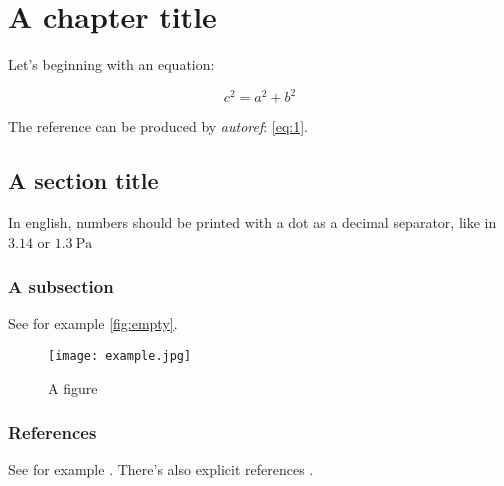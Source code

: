 \documentclass[a5,brazil,english]{brthesis}
\begin{document}
\renewcommand{\nomname}{\listadesimbolosname}
\pdfbookmark[0]{\nomname}{las}
\printnomenclature
\cleardoublepage

\tableofcontents*
\cleardoublepage

\textual

\chapter{A chapter title}
\label{cha:chapter-title}

Let's beginning with an equation:

\begin{equation}
  \label{eq:1}
  c^2 = a^2 + b^2
\end{equation}

The reference can be produced by \textsl{autoref}: \autoref{eq:1}.

\section{A section title}
\label{sec:section-title}

In english, numbers should be printed with a dot as a decimal separator, like in $\num{3.14}$ or $\SI{1.3}{\pascal}$

\subsection{A subsection}
\label{sec:subsection}

See for example \autoref{fig:empty}.

\begin{figure}[!ht]
  \centering
  \texttt{[image: example.jpg]}
  \caption{A figure}
  \label{fig:empty}
\end{figure}

\subsection{References}
\label{sec:references}

See for example . There's also explicit references \cite{bib:furlani}.


\postextual


\end{document}

